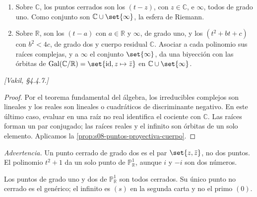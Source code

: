 \begin{coro}
\label{coro:s08-puntos-complejos-reales}
\begin{enumerate}[label=(\alph*)]
\item Sobre $\mathbb C$, los puntos cerrados son los $(t-z)$, con $z\in\mathbb C$, e $\infty$, todos de grado uno. Como conjunto son $\mathbb C\cup\set{\infty}$, la esfera de Riemann.
\item Sobre $\mathbb R$, son los $(t-a)$ con $a\in\mathbb R$ y $\infty$, de grado uno, y los $(t^2+bt+c)$ con $b^2<4c$, de grado dos y cuerpo residual $\mathbb C$. Asociar a cada polinomio sus raíces complejas, y a $\infty$ el conjunto $\set{\infty}$, da una biyección con las órbitas de $\gal(\mathbb C/\mathbb R)=\set{\id,z\mapsto\bar z}$ en $\mathbb C\cup\set{\infty}$.
\end{enumerate}
\emph{[Vakil, \S4.4.7.]}
\end{coro}
\begin{proof}
Por el teorema fundamental del álgebra, los irreducibles complejos son lineales y los reales son lineales o cuadráticos de discriminante negativo. En este último caso, evaluar en una raíz no real identifica el cociente con $\mathbb C$. Las raíces forman un par conjugado; las raíces reales y el infinito son órbitas de un solo elemento. Aplicamos la \cref{prop:s08-puntos-proyectiva-cuerpo}.
\end{proof}

\begin{center}
\end{center}
\emph{Advertencia.} Un punto cerrado de grado dos es el par $\set{z,\bar z}$, no dos puntos. El polinomio $t^2+1$ da un solo punto de $\mathbb P_{\mathbb R}^1$, aunque $i$ y $-i$ son dos números.

Los puntos de grado uno y dos de $\mathbb P_{\mathbb R}^1$ son todos cerrados. Su único punto no cerrado es el genérico; el infinito es $(s)$ en la segunda carta y no el primo $(0)$.

